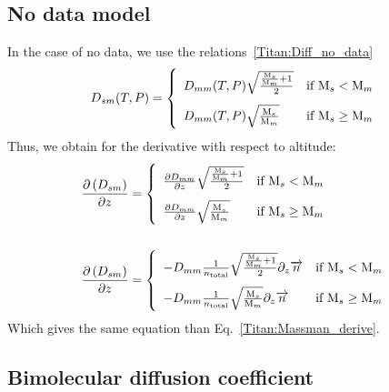 \subsection{No data model}

In the case of no data, we use the relations~\ref{Titan:Diff_no_data}
\begin{equation}
\renewcommand{\arraystretch}{2}
\diff_{sm}(T,P) =
\left\{\begin{array}{l@{\quad}r}
\diff_{mm}(T,P)\sqrt{\frac{\frac{\Mm_s}{\Mm_m} + 1}{2}} & \text{if }\Mm_s < \Mm_m    \\
\diff_{mm}(T,P)\sqrt{\frac{\Mm_s}{\Mm_m}}               & \text{if }\Mm_s \geq \Mm_m \\
\end{array}\right.
\label{Titan:Diff_no_data}
\end{equation}
Thus, we obtain for the derivative with respect to altitude:
\begin{equation}
\begin{split}
\renewcommand{\arraystretch}{2}
\dOverdz{\diff_{sm}} & =
\left\{\begin{array}{l@{\quad}r}
\doverdz{\diff_{mm}}\sqrt{\frac{\frac{\Mm_s}{\Mm_m} + 1}{2}}  & \text{if } \Mm_s < \Mm_m    \\
\doverdz{\diff_{mm}}\sqrt{\frac{\Mm_s}{\Mm_m}}                & \text{if } \Mm_s \geq \Mm_m \\
\end{array}\right. 
\\\\
\dOverdz{\diff_{sm}} & =
\left\{\begin{array}{l@{\quad}r}
-\diff_{mm}\frac{1}{\concAtm}\sqrt{\frac{\frac{\Mm_s}{\Mm_m} + 1}{2}}\divergez{\conc}  & \text{if } \Mm_s < \Mm_m    \\
-\diff_{mm}\frac{1}{\concAtm}\sqrt{\frac{\Mm_s}{\Mm_m}}\divergez{\conc}                & \text{if } \Mm_s \geq \Mm_m \\
\end{array}\right. 
\end{split}
\label{Titan:diffusion_no_data_derive}
\end{equation}
Which gives the same equation than Eq.~\ref{Titan:Massman_derive}.

\subsection{Bimolecular diffusion coefficient}

